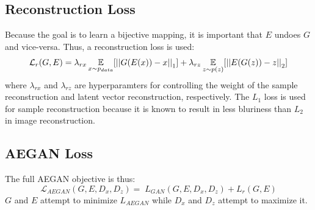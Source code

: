 \documentclass{article}
\begin{document}
\subsection{Reconstruction Loss}
Because the goal is to learn a bijective mapping, it is important that $E$ undoes $G$ and vice-versa. Thus, a reconstruction loss is used:
\begin{equation}
\mathcal
{L}_{r}(G, E) = \lambda_{rx}\operatorname*{\mathbb{E}}_{x \sim p_{data}}[\left| \left| G(E(x)) - x \right| \right|_1] + \lambda_{rz}\operatorname*{\mathbb{E}}_{z \sim p(z)}[\left| \left| E(G(z)) - z \right| \right|_2] 
\end{equation}
where $\lambda_{rx}$ and $\lambda_{rz}$ are hyperparamters for controlling the weight of the sample reconstruction and latent vector reconstruction, respectively. The $L_1$ loss is used for sample reconstruction because it is known to result in less bluriness than $L_2$ in image reconstruction. 

\subsection{AEGAN Loss}
The full AEGAN objective is thus:
\begin{equation}
\mathcal
{L}_{AEGAN}(G, E, D_x, D_z) = \; {L}_{GAN}(G, E, D_x, D_z) + {L}_{r}(G, E) 
\end{equation}
$G$ and $E$ attempt to minimize ${L}_{AEGAN}$ while $D_x$ and $D_z$ attempt to maximize it.
\end{document}
